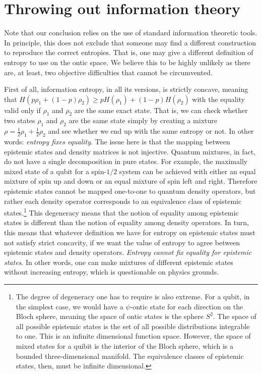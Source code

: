 \documentclass[10pt,twocolumn, nofootinbib]{revtex4-2}
\begin{document}
\section{Throwing out information theory}

Note that our conclusion relies on the use of standard information theoretic tools. In principle, this does not exclude that someone may find a different construction to reproduce the correct entropies. That is, one may give a different definition of entropy to use on the ontic space. We believe this to be highly unlikely as there are, at least, two objective difficulties that cannot be circumvented.

First of all, information entropy, in all its versions, is strictly concave, meaning that $H(p \rho_1 + (1-p) \rho_2) \geq p H(\rho_1) + (1-p) H(\rho_2)$ with the equality valid only if $\rho_1$ and $\rho_2$ are the same exact state. That is, we can check whether two states $\rho_1$ and $\rho_2$ are the same state simply by creating a mixture $\rho = \frac{1}{2} \rho_1 + \frac{1}{2} \rho_2$ and see whether we end up with the same entropy or not. In other words: \emph{entropy fixes equality}.
The issue here is that the mapping between epistemic states and density matrices is not injective. Quantum mixtures, in fact, do not have a single decomposition in pure states. For example, the maximally mixed state of a qubit for a spin-$1/2$ system can be achieved with either an equal mixture of spin up and down or an equal mixture of spin left and right. Therefore epistemic states cannot be mapped one-to-one to quantum density operators, but rather each density operator corresponds to an equivalence class of epistemic states.\footnote{The degree of degeneracy one has to require is also extreme. For a qubit, in the simplest case, we would have a $\psi$-ontic state for each direction on the Bloch sphere, meaning the space of ontic states is the sphere $S^2$. The space of all possible epistemic states is the set of all possible distributions integrable to one. This is an infinite dimensional function space. However, the space of mixed states for a quibit is the interior of the Bloch sphere, which is a bounded three-dimensional manifold. The equivalence classes of epistemic states, then, must be infinite dimensional.} This degeneracy means that the notion of equality among epistemic states is different than the notion of equality among density operators. In turn, this means that whatever definition we have for entropy on epistemic states must not satisfy strict concavity, if we want the value of entropy to agree between epistemic states and density operators. \emph{Entropy cannot fix equality for epistemic states}. In other words, one can make mixtures of different epistemic states without increasing entropy, which is questionable on physics grounds.
\end{document}
